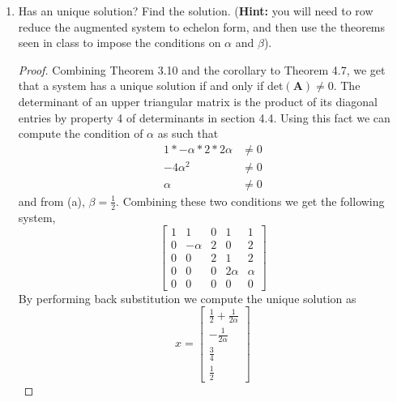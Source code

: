 \documentclass[11pt]{scrartcl}
\begin{document}
\begin{enumerate}[label=\alph*.]
{\begin{proof}
		      By Theorem 3.11, a system is consistent if and only if $rank(\mathbf{A}) = rank(\mathbf{A}|\mathbf{b})$.
		      Thus this system will have no solution if $2\beta - 1 \neq 0$, which is when $\beta \neq \frac12$.
		      We observe that there will be no conditions on $\alpha$.
	      \end{proof}
	      }
	\item{
	      Has an unique solution? Find the solution.
	      (\textbf{Hint:} you will need to row reduce the augmented system to echelon form,
	      and then use the theorems seen in class to impose the conditions on $\alpha$ and $\beta$).
	      \begin{proof}
		      Combining Theorem 3.10 and the corollary to Theorem 4.7, we get that a system has a
		      unique solution if and only if det$(\mathbf{A}) \neq 0$.
		      The determinant of an upper triangular matrix is the product of its diagonal
		      entries by property 4 of determinants in section 4.4.
		      Using this fact we can compute the condition of $\alpha$ as such that
		      \begin{align*}
			      1*-\alpha*2*2\alpha & \neq 0 \\
			      -4\alpha^2          & \neq 0 \\
			      \alpha              & \neq 0
		      \end{align*}
		      and from (a), $\beta = \frac12$. Combining these two conditions we get the following system,
		      \[
			      \left [ \begin{array}{cccc|c}
					      1 & 1        & 0 & 1       & 1      \\
					      0 & - \alpha & 2 & 0       & 2      \\
					      0 & 0        & 2 & 1       & 2      \\
					      0 & 0        & 0 & 2\alpha & \alpha \\
					      0 & 0        & 0 & 0       & 0
				      \end{array} \right ]
		      \]
		      By performing back substitution we compute the unique solution as
		      \[
			      x = \begin{bmatrix}
				      \frac12 + \frac{1}{2\alpha} \\
				      -\frac{1}{2\alpha}          \\
				      \frac34                     \\
				      \frac12
			      \end{bmatrix}
		      \]
	      \end{proof}
	      }


\end{enumerate}
\end{document}
